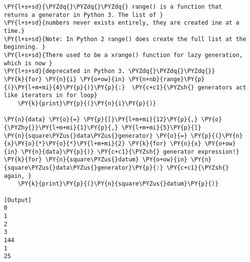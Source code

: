 \begin{Verbatim}[label=\makebox{\url{https://github.com/lucabaldini/cmepda/tree/master/slides/latex/snippets/generators.py}},commandchars=\\\{\}]
\PY{l+s+sd}{\PYZdq{}\PYZdq{}\PYZdq{} range() is a function that returns a generator in Python 3. The list of }
\PY{l+s+sd}{numbers never exists entirely, they are created ine at a time.}
\PY{l+s+sd}{Note: In Python 2 range() does create the full list at the beginning. }
\PY{l+s+sd}{There used to be a xrange() function for lazy generation, which is now }
\PY{l+s+sd}{deprecated in Python 3. \PYZdq{}\PYZdq{}\PYZdq{}}
\PY{k}{for} \PY{n}{i} \PY{o+ow}{in} \PY{n+nb}{range}\PY{p}{(}\PY{l+m+mi}{4}\PY{p}{)}\PY{p}{:}  \PY{c+c1}{\PYZsh{} generators act like iterators in for loop}
    \PY{k}{print}\PY{p}{(}\PY{n}{i}\PY{p}{)}

\PY{n}{data} \PY{o}{=} \PY{p}{[}\PY{l+m+mi}{12}\PY{p}{,} \PY{o}{\PYZhy{}}\PY{l+m+mi}{1}\PY{p}{,} \PY{l+m+mi}{5}\PY{p}{]}
\PY{n}{square\PYZus{}data\PYZus{}generator} \PY{o}{=} \PY{p}{(}\PY{n}{x}\PY{o}{*}\PY{o}{*}\PY{l+m+mi}{2} \PY{k}{for} \PY{n}{x} \PY{o+ow}{in} \PY{n}{data}\PY{p}{)} \PY{c+c1}{\PYZsh{} generator expression!}
\PY{k}{for} \PY{n}{square\PYZus{}datum} \PY{o+ow}{in} \PY{n}{square\PYZus{}data\PYZus{}generator}\PY{p}{:} \PY{c+c1}{\PYZsh{} again, }
    \PY{k}{print}\PY{p}{(}\PY{n}{square\PYZus{}datum}\PY{p}{)}

[Output]
0
1
2
3
144
1
25
\end{Verbatim}